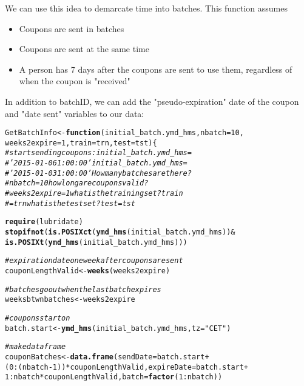\documentclass[10pt]{report}
\makeatletter
\newcommand{\hlnum}[1]{\textcolor[rgb]{0.686,0.059,0.569}{#1}}%
\newcommand{\hlstr}[1]{\textcolor[rgb]{0.192,0.494,0.8}{#1}}%
\newcommand{\hlcom}[1]{\textcolor[rgb]{0.678,0.584,0.686}{\textit{#1}}}%
\newcommand{\hlopt}[1]{\textcolor[rgb]{0,0,0}{#1}}%
\newcommand{\hlstd}[1]{\textcolor[rgb]{0.345,0.345,0.345}{#1}}%
\newcommand{\hlkwa}[1]{\textcolor[rgb]{0.161,0.373,0.58}{\textbf{#1}}}%
\newcommand{\hlkwb}[1]{\textcolor[rgb]{0.69,0.353,0.396}{#1}}%
\newcommand{\hlkwc}[1]{\textcolor[rgb]{0.333,0.667,0.333}{#1}}%
\newcommand{\hlkwd}[1]{\textcolor[rgb]{0.737,0.353,0.396}{\textbf{#1}}}%
\newenvironment{kframe}{%
 \def\at@end@of@kframe{}%
 \ifinner\ifhmode%
  \def\at@end@of@kframe{\end{minipage}}%
  \begin{minipage}{\columnwidth}%
 \fi\fi%
 \def\FrameCommand##1{\hskip\@totalleftmargin \hskip-\fboxsep
 \colorbox{shadecolor}{##1}\hskip-\fboxsep
     \hskip-\linewidth \hskip-\@totalleftmargin \hskip\columnwidth}%
 \MakeFramed {\advance\hsize-\width
   \@totalleftmargin\z@ \linewidth\hsize
   \@setminipage}}%
 {\par\unskip\endMakeFramed%
 \at@end@of@kframe}
\newenvironment{knitrout}{}{} %
\makeatother
\begin{document}
We can use this idea to demarcate time into batches. 
This function assumes 
\begin{itemize}
   \item Coupons are sent in batches
\item Coupons are sent at the same time
\item A person has 7 days after the coupons are sent to use them, regardless of when the coupon is "received"
\end{itemize}

In addition to batchID, we can add the "pseudo-expiration" date of the coupon and "date sent" variables to our data:
\begin{knitrout}
\color{fgcolor}\begin{kframe}
\begin{alltt}
\hlstd{GetBatchInfo} \hlkwb{<-} \hlkwa{function}\hlstd{(}\hlkwc{initial_batch.ymd_hms}\hlstd{,} \hlkwc{nbatch} \hlstd{=} \hlnum{10}\hlstd{,}
    \hlkwc{weeks2expire} \hlstd{=} \hlnum{1}\hlstd{,} \hlkwc{train} \hlstd{= trn,} \hlkwc{test} \hlstd{= tst) \{}
    \hlcom{# start sending coupons: initial_batch.ymd_hms =}
    \hlcom{# '2015-01-06 1:00:00' initial_batch.ymd_hms =}
    \hlcom{# '2015-01-03 1:00:00' How many batches are there?}
    \hlcom{# nbatch = 10 how long are coupons valid?}
    \hlcom{# weeks2expire = 1 what is the training set?  train}
    \hlcom{# = trn what is the test set?  test = tst}

    \hlkwd{require}\hlstd{(lubridate)}
    \hlkwd{stopifnot}\hlstd{(}\hlkwd{is.POSIXct}\hlstd{(}\hlkwd{ymd_hms}\hlstd{(initial_batch.ymd_hms))} \hlopt{&}
        \hlkwd{is.POSIXt}\hlstd{(}\hlkwd{ymd_hms}\hlstd{(initial_batch.ymd_hms)))}

    \hlcom{# expiration date one week after coupons are sent}
    \hlstd{couponLengthValid} \hlkwb{<-} \hlkwd{weeks}\hlstd{(weeks2expire)}

    \hlcom{# batches go out when the last batch expires}
    \hlstd{weeksbtwnbatches} \hlkwb{<-} \hlstd{weeks2expire}

    \hlcom{# coupons start on}
    \hlstd{batch.start} \hlkwb{<-} \hlkwd{ymd_hms}\hlstd{(initial_batch.ymd_hms,} \hlkwc{tz} \hlstd{=} \hlstr{"CET"}\hlstd{)}

    \hlcom{# make data frame}
    \hlstd{couponBatches} \hlkwb{<-} \hlkwd{data.frame}\hlstd{(}\hlkwc{sendDate} \hlstd{= batch.start} \hlopt{+}
        \hlstd{(}\hlnum{0}\hlopt{:}\hlstd{(nbatch} \hlopt{-} \hlnum{1}\hlstd{))} \hlopt{*} \hlstd{couponLengthValid,} \hlkwc{expireDate} \hlstd{= batch.start} \hlopt{+}
        \hlnum{1}\hlopt{:}\hlstd{nbatch} \hlopt{*} \hlstd{couponLengthValid,} \hlkwc{batch} \hlstd{=} \hlkwd{factor}\hlstd{(}\hlnum{1}\hlopt{:}\hlstd{nbatch))}


\end{alltt}
\end{kframe}
\end{knitrout}
\end{document}
